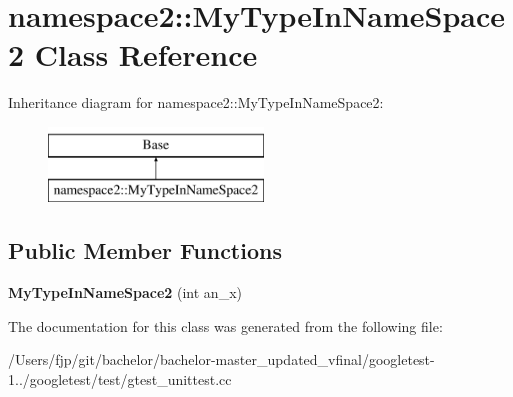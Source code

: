 \hypertarget{classnamespace2_1_1_my_type_in_name_space2}{}\section{namespace2\+:\+:My\+Type\+In\+Name\+Space2 Class Reference}
\label{classnamespace2_1_1_my_type_in_name_space2}
Inheritance diagram for namespace2\+:\+:My\+Type\+In\+Name\+Space2\+:\begin{figure}[H]
\begin{center}
\leavevmode
\includegraphics[height=2.000000cm]{classnamespace2_1_1_my_type_in_name_space2}
\end{center}
\end{figure}
\subsection*{Public Member Functions}
\begin{DoxyCompactItemize}
\item 
\mbox{\label{classnamespace2_1_1_my_type_in_name_space2_a033025628289dbf29022b2bfbe66f53e}} 
{\bfseries My\+Type\+In\+Name\+Space2} (int an\+\_\+x)
\end{DoxyCompactItemize}


The documentation for this class was generated from the following file\+:\begin{DoxyCompactItemize}
\item 
/\+Users/fjp/git/bachelor/bachelor-\/master\+\_\+updated\+\_\+vfinal/googletest-\/1../googletest/test/gtest\+\_\+unittest.\+cc\end{DoxyCompactItemize}
